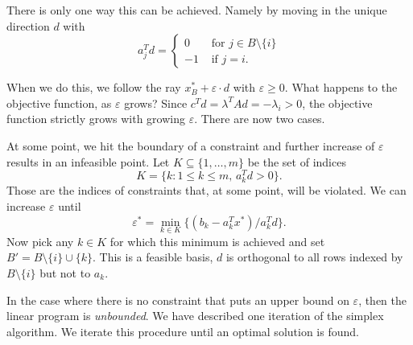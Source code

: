 There is only one way this can be achieved. Namely by moving in the unique direction $d$ with
\begin{displaymath}
  a_j^T d =
  \begin{cases}
    0 & \text{ for } j \in B \setminus \{i\} \\
    -1 & \text{ if } j =i.
  \end{cases}
\end{displaymath}

When we do this, we follow the ray $x^*_B + \varepsilon \cdot d$ with $\varepsilon
\geq 0$. What happens to the objective function, as $\varepsilon$ grows? Since
$c^Td = \lambda^TA d = -\lambda_i >0$, the objective function strictly
grows with growing $\varepsilon$. There are now two cases. 

At some point, we hit the boundary of a constraint and further increase of $\varepsilon$ results in an infeasible point. Let $K \subseteq \{ 1,\dots,m\}$ be the set of indices 
\begin{equation}
  \label{eq:s-6}
  K = \{ k \colon 1 \leq k \leq m, \,a_k^T d >0\}. 
\end{equation}
Those are the indices of constraints that, at some point, will be violated. We can increase $\varepsilon$ until 
\begin{equation}
  \label{eq:s-8}
  \varepsilon^* = \min_{k \in K} \{ (b_k - a_k^Tx^*) / a_k^Td\}. 
\end{equation}
Now pick any $k \in K$ for which this minimum is achieved and set $B' = B \setminus \{i\} \cup \{k\}$. This is a feasible basis, $d$ is orthogonal to all rows  indexed by $B \setminus \{i\}$ but not to $a_k$. 

In the case where there is no constraint that puts an upper bound on $\varepsilon$, then the linear program is \emph{unbounded}. 
We have described one iteration of the simplex algorithm. We iterate this procedure until an optimal solution is found. 



